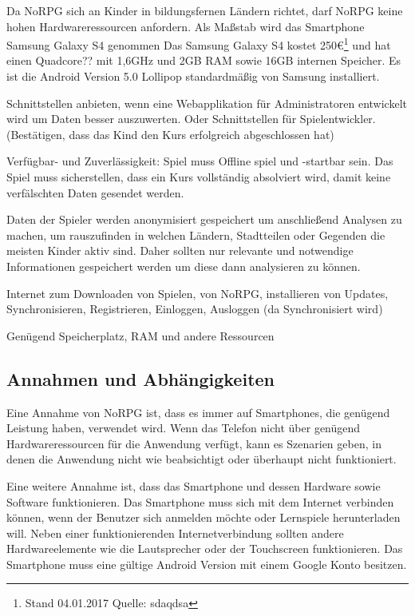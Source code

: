 		Da NoRPG sich an Kinder in bildungsfernen Ländern richtet, darf NoRPG keine hohen Hardwareressourcen anfordern. Als Maßstab wird das Smartphone Samsung Galaxy S4 genommen %
		Das Samsung Galaxy S4 kostet 250€\footnote{Stand 04.01.2017 Quelle: sdaqdsa} und hat einen Quadcore?? mit 1,6GHz und 2GB RAM sowie 16GB internen Speicher. Es ist die Android Version 5.0 Lollipop standardmäßig von Samsung installiert.
		
		Schnittstellen anbieten, wenn eine Webapplikation für Administratoren entwickelt wird um Daten besser auszuwerten. Oder Schnittstellen für Spielentwickler. (Bestätigen, dass das Kind den Kurs erfolgreich abgeschlossen hat)
				
		Verfügbar- und Zuverlässigkeit: Spiel muss Offline spiel und -startbar sein. Das Spiel muss sicherstellen, dass ein Kurs vollständig absolviert wird, damit keine verfälschten Daten gesendet werden. 

		Daten der Spieler werden anonymisiert gespeichert um anschließend Analysen zu machen, um rauszufinden in welchen Ländern, Stadtteilen oder Gegenden die meisten Kinder aktiv sind. Daher sollten nur relevante und notwendige Informationen gespeichert werden um diese dann analysieren zu können.
		
		Internet zum Downloaden von Spielen, von NoRPG, installieren von Updates, Synchronisieren, Registrieren, Einloggen, Ausloggen (da Synchronisiert wird) 
		
		Genügend Speicherplatz, RAM und andere Ressourcen
				
	\subsection{Annahmen und Abhängigkeiten}
		Eine Annahme von NoRPG ist, dass es immer auf Smartphones, die genügend Leistung haben, verwendet wird. Wenn das Telefon nicht über genügend Hardwareressourcen für die Anwendung verfügt, kann es Szenarien geben, in denen die Anwendung nicht wie beabsichtigt oder überhaupt nicht funktioniert.
		
		Eine weitere Annahme ist, dass das Smartphone und dessen Hardware sowie Software funktionieren. Das Smartphone muss sich mit dem Internet verbinden können, wenn der Benutzer sich anmelden möchte oder Lernspiele herunterladen will. Neben einer funktionierenden Internetverbindung sollten andere Hardwareelemente wie die Lautsprecher oder der Touchscreen funktionieren. Das Smartphone muss eine gültige Android Version mit einem Google Konto besitzen.
		
